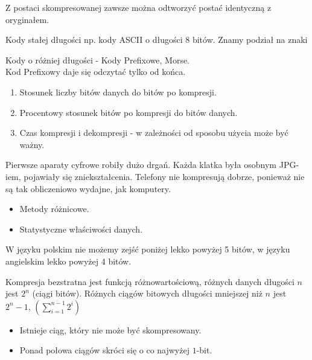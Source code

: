 \documentclass{article}
\numberwithin{equation}{subsection}
\newenvironment{definition}[1]{%
    \trivlist
    \item[\hskip\labelsep\textbf{Definition. #1.}]
    \ignorespaces
}{%
    \endtrivlist
}
\newenvironment{fact}[1]{%
    \trivlist
    \item[\hskip\labelsep\textbf{Fact. #1.}]
    \ignorespaces
}{%
    \endtrivlist
}
\begin{document}
\begin{definition}{Kompresja Bezstratna}
    Z postaci skompresowanej zawsze można odtworzyć postać identyczną z oryginałem.
\end{definition}

\begin{definition}{Kody stałej długości}
    Kody stałej długości np. kody ASCII o długości 8 bitów. Znamy podział na znaki
\end{definition}

\begin{definition}{Kody zmiennej długości}
    Kody o różniej długości - Kody Prefixowe, Morse.\\
    Kod Prefixowy daje się odczytać tylko od końca.
\end{definition}

\begin{fact}{Miary jakości kompresji}
    \begin{enumerate}
        \item Stosunek liczby bitów danych do bitów po kompresji.
        \item Procentowy stosunek bitów po kompresji do bitów danych.
        \item Czas kompresji i dekompresji - w zależności od sposobu użycia może być ważny.
    \end{enumerate}
    Pierwsze aparaty cyfrowe robiły dużo drgań. Każda klatka była osobnym JPG-iem, pojawiały się zniekształcenia.
    Telefony nie kompresują dobrze, ponieważ nie są tak obliczeniowo wydajne, jak komputery.
\end{fact}

\begin{fact}{Metody kompresji}
    \begin{itemize}
        \item Metody różnicowe.
        \item Statystyczne właściwości danych.
    \end{itemize}
    W języku polskim nie możemy zejść poniżej lekko powyżej 5 bitów, w języku angielskim lekko powyżej 4 bitów.
\end{fact}

\begin{fact}{Granice Kompresji}
    Kompresja bezstratna jest funkcją różnowartościową, różnych danych długości $n$ jest $2^n$ (ciągi bitów).
    Różnych ciągów bitowych długości mniejszej niż $n$ jest $2^n -1$, $(\sum_{i=1}^{n-1} 2^i)$
    \begin{itemize}
        \item Istnieje ciąg, który nie może być skompresowany.
        \item Ponad połowa ciągów skróci się o co najwyżej $1$-bit.
    \end{itemize}
\end{fact}
\end{document}
